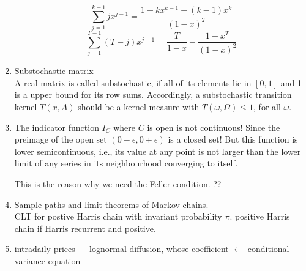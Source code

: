 \begin{enumerate}
 $$ \sum_{j=1}^{k-1}jx^{j-1}=\frac{1-kx^{k-1}+(k-1)x^k}{(1-x)^2} $$
  $$ \sum_{j=1}^{T-1}(T-j)x^{j-1}=\frac{T}{1-x}-\frac{1-x^T}{(1-x)^2} $$

\item Substochastic matrix\\
A real matrix is called substochastic, if all of its elements lie in $ [0,1] $ and 1 is a upper bound for its row sums.
Accordingly, a substochastic transition kernel $ T(x,A) $ should be a kernel measure with $ T(\omega,\Omega)\leq 1 $, for all $ \omega $.


\item The indicator function $ I_{C} $ where $ C $ is open is not continuous! Since the preimage of the open set $ (0-\epsilon,0+\epsilon) $ is a closed set! But this function is lower semicontinuous, i.e., its value at any point is not larger than the lower limit of any series in its neighbourhood converging to itself.

This is the reason why we need the Feller condition.
??

\item Sample paths and limit theorems of Markov chains.\\
CLT for postive Harris chain with invariant probability $ \pi $.
positive Harris chain if Harris recurrent and positive.

\item
intradaily prices --- lognormal diffusion, whose coefficient $ \leftarrow $ conditional variance equation

\end{enumerate}
